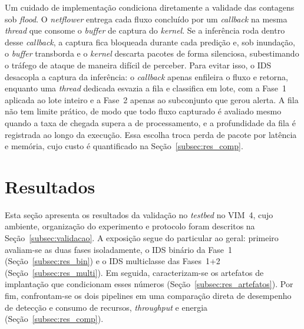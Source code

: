 \documentclass[12pt]{article}
\begin{document}
Um cuidado de implementação condiciona diretamente a validade das contagens sob
\textit{flood}. O \textit{netflower} entrega cada fluxo concluído por um
\textit{callback} na mesma \textit{thread} que consome o \textit{buffer} de
captura do \textit{kernel}. Se a inferência roda dentro desse \textit{callback},
a captura fica bloqueada durante cada predição e, sob inundação, o \textit{buffer}
transborda e o \textit{kernel} descarta pacotes de forma silenciosa, subestimando
o tráfego de ataque de maneira difícil de perceber. Para evitar isso, o IDS
desacopla a captura da inferência: o \textit{callback} apenas enfileira o fluxo e
retorna, enquanto uma \textit{thread} dedicada esvazia a fila e classifica em
lote, com a Fase~1 aplicada ao lote inteiro e a Fase~2 apenas ao subconjunto que
gerou alerta. A fila não tem limite prático, de modo que todo fluxo capturado é
avaliado mesmo quando a taxa de chegada supera a de processamento, e a
profundidade da fila é registrada ao longo da execução. Essa escolha troca perda
de pacote por latência e memória, cujo custo é quantificado na
Seção~\ref{subsec:res_comp}.

\section{Resultados}
\label{sec:resultados}

Esta seção apresenta os resultados da validação no \textit{testbed} no VIM~4, cujo ambiente,
organização do experimento e protocolo foram descritos na
Seção~\ref{subsec:validacao}. A exposição segue do particular ao geral: primeiro
avaliam-se as duas fases isoladamente, o IDS binário da Fase~1
(Seção~\ref{subsec:res_bin}) e o IDS multiclasse das Fases~1+2
(Seção~\ref{subsec:res_multi}). Em seguida, caracterizam-se os artefatos de
implantação que condicionam esses números (Seção~\ref{subsec:res_artefatos}). Por fim, confrontam-se os dois pipelines em uma comparação direta de desempenho de detecção e consumo de recursos, \textit{throughput} e energia (Seção~\ref{subsec:res_comp}).
\end{document}
